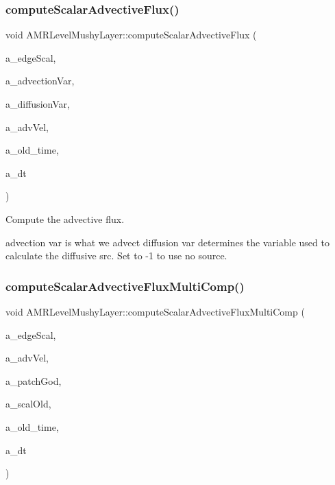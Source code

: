 \subsubsection{\texorpdfstring{compute\+Scalar\+Advective\+Flux()}{computeScalarAdvectiveFlux()}\hspace{0.1cm}{\footnotesize\ttfamily [2/2]}}
{\footnotesize\ttfamily void A\+M\+R\+Level\+Mushy\+Layer\+::compute\+Scalar\+Advective\+Flux (\begin{DoxyParamCaption}\item[{\textbf{ Level\+Data}$<$ \textbf{ Flux\+Box} $>$ \&}]{a\+\_\+edge\+Scal,  }\item[{int}]{a\+\_\+advection\+Var,  }\item[{int}]{a\+\_\+diffusion\+Var,  }\item[{\textbf{ Level\+Data}$<$ \textbf{ Flux\+Box} $>$ \&}]{a\+\_\+adv\+Vel,  }\item[{\textbf{ Real}}]{a\+\_\+old\+\_\+time,  }\item[{\textbf{ Real}}]{a\+\_\+dt }\end{DoxyParamCaption})\hspace{0.3cm}{\ttfamily [protected]}}



Compute the advective flux. 

advection var is what we advect diffusion var determines the variable used to calculate the diffusive src. Set to -\/1 to use no source. \mbox{\label{class_a_m_r_level_mushy_layer_a496393891a2db8a73b2f398f90324af5}} 
\subsubsection{\texorpdfstring{compute\+Scalar\+Advective\+Flux\+Multi\+Comp()}{computeScalarAdvectiveFluxMultiComp()}}
{\footnotesize\ttfamily void A\+M\+R\+Level\+Mushy\+Layer\+::compute\+Scalar\+Advective\+Flux\+Multi\+Comp (\begin{DoxyParamCaption}\item[{\textbf{ Level\+Data}$<$ \textbf{ Flux\+Box} $>$ \&}]{a\+\_\+edge\+Scal,  }\item[{\textbf{ Level\+Data}$<$ \textbf{ Flux\+Box} $>$ \&}]{a\+\_\+adv\+Vel,  }\item[{\textbf{ Patch\+Godunov} \&}]{a\+\_\+patch\+God,  }\item[{\textbf{ Level\+Data}$<$ \textbf{ F\+Array\+Box} $>$ \&}]{a\+\_\+scal\+Old,  }\item[{\textbf{ Real}}]{a\+\_\+old\+\_\+time,  }\item[{\textbf{ Real}}]{a\+\_\+dt }\end{DoxyParamCaption})\hspace{0.3cm}{\ttfamily [protected]}}



